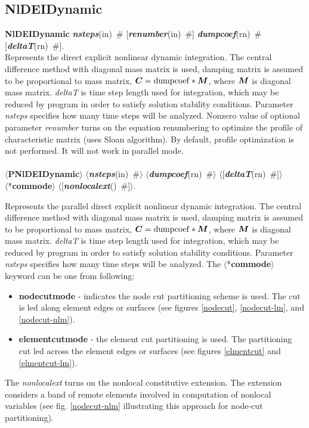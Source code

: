 \documentclass[draft]{article}
\newcommand{\mbf}[1]{\mbox{\boldmath$#1$}}
\newcommand{\param}[1]{{\em #1}}
\newcommand{\keywordnotype}[1]{\mbox{{\it{\bf{#1}}}}}
\newcommand{\keyword}[2]{\mbox{{\keywordnotype{#1}\tiny (#2)}}}
\newcommand{\entKeywordInst}[1]{\mbox{{\bf{{#1}}}}}
\newcommand{\field}[2]{\mbox{\keyword{#1}{#2}~\#}}
\newcommand{\optField}[2]{\mbox{[\field{#1}{#2}]}}
\newcommand{\Pmode}[1]{{\sffamily #1}}
\newcommand{\PentKeyword}[1]{\mbox{{$\langle$*{\bf{#1}}$\rangle$}}}
\newcommand{\PentKeywordInst}[1]{\mbox{$\langle${\bf{{#1}}}$\rangle$}}
\newcommand{\Pfield}[2]{\mbox{$\langle$\keyword{#1}{#2}~\#$\rangle$}}
\newcommand{\PoptField}[2]{\mbox{$\langle$[\field{#1}{#2}]$\rangle$}}
\begin{document}
\subsection{NlDEIDynamic}
\label{NlDEIDynamic}
\entKeywordInst{NlDEIDynamic} \field{nsteps}{in} \optField{renumber}{in}
\field{dumpcoef}{rn} \optField{deltaT}{rn}.\\
Represents the direct explicit  nonlinear dynamic  integration.
The central difference method with diagonal mass matrix is used,
damping matrix is assumed to be proportional to mass matrix, $\mbf{C}
= {\rm dumpcoef} * \mbf{M}$, where
$\mbf{M}$ is diagonal mass matrix. \param{deltaT} is time step length used for
integration, which may be reduced by program in order to satisfy
solution stability conditions. Parameter \param{nsteps} specifies
how many time steps will be analyzed.
Nonzero value of optional parameter \param{renumber} turns on the
equation renumbering to optimize the profile of characteristic matrix
(uses Sloan algorithm). By default, profile optimization is not
performed. It will not work in parallel mode.
\\ \\
\noindent
\PentKeywordInst{PNlDEIDynamic} \Pfield{nsteps}{in}
\Pfield{dumpcoef}{rn} \PoptField{deltaT}{rn} \\\PentKeyword{commode} \PoptField{nonlocalext}{}.\\
\Pmode{
Represents the parallel direct explicit  nonlinear dynamic  integration.
The central difference method with diagonal mass matrix is used,
damping matrix is assumed to be proportional to mass matrix, $\mbf{C}
= {\rm dumpcoef} * \mbf{M}$, where
$\mbf{M}$ is diagonal mass matrix. \param{deltaT} is time step length used for
integration, which may be reduced by program in order to satisfy
solution stability conditions. Parameter \param{nsteps} specifies
how many time steps will be analyzed.
The \PentKeyword{commode} keyword can be one from following:
\begin{itemize}
\item \entKeywordInst{nodecutmode} - indicates the node cut partitioning scheme is
used. The cut is led along element edges or surfaces (see
figures \ref{nodecut}, \ref{nodecut-lm}, and \ref{nodecut-nlm}).
\item \entKeywordInst{elementcutmode} - the element cut partitioning is used. The
partitioning cut led across the element edges or surfaces (see 
figures \ref{elmentcut} and \ref{elmentcut-lm}).
\end{itemize}
\Pmode{
The \param{nonlocalext} turns on the nonlocal constitutive
extension. The extension considers a band of remote elements involved
in computation of nonlocal variables (see fig. \ref{nodecut-nlm} illustrating
this approach for node-cut partitioning).
}
}
\end{document}
